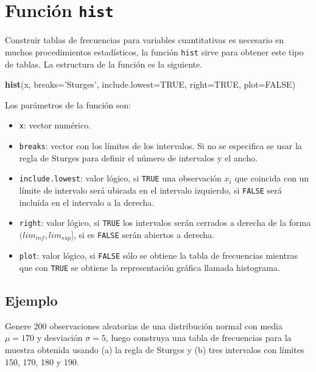 \documentclass[10pt,]{krantz}
\makeatletter
\newenvironment{Shaded}{\begin{snugshade}}{\end{snugshade}}
\newcommand{\KeywordTok}[1]{\textcolor[rgb]{0.13,0.29,0.53}{\textbf{{#1}}}}
\newcommand{\DataTypeTok}[1]{\textcolor[rgb]{0.13,0.29,0.53}{{#1}}}
\newcommand{\StringTok}[1]{\textcolor[rgb]{0.31,0.60,0.02}{{#1}}}
\newcommand{\OtherTok}[1]{\textcolor[rgb]{0.56,0.35,0.01}{{#1}}}
\newcommand{\NormalTok}[1]{{#1}}
\providecommand{\tightlist}{%
  \setlength{\itemsep}{0pt}\setlength{\parskip}{0pt}}
\newenvironment{kframe}{%
\medskip{}
\setlength{\fboxsep}{.8em}
 \def\at@end@of@kframe{}%
 \ifinner\ifhmode%
  \def\at@end@of@kframe{\end{minipage}}%
  \begin{minipage}{\columnwidth}%
 \fi\fi%
 \def\FrameCommand##1{\hskip\@totalleftmargin \hskip-\fboxsep
 \colorbox{shadecolor}{##1}\hskip-\fboxsep
     \hskip-\linewidth \hskip-\@totalleftmargin \hskip\columnwidth}%
 \MakeFramed {\advance\hsize-\width
   \@totalleftmargin\z@ \linewidth\hsize
   \@setminipage}}%
 {\par\unskip\endMakeFramed%
 \at@end@of@kframe}
\renewenvironment{Shaded}{\begin{kframe}}{\end{kframe}}
\makeatother
\begin{document}
\section{\texorpdfstring{Función \texttt{hist}
}{Función hist }}\label{funcion-hist}

Construir tablas de frecuencias para variables cuantitativas es
necesario en muchos procedimientos estadísticos, la función
\texttt{hist} sirve para obtener este tipo de tablas. La estructura de
la función es la siguiente.

\begin{Shaded}
\begin{Highlighting}[]
\KeywordTok{hist}\NormalTok{(x, }\DataTypeTok{breaks=}\StringTok{'Sturges'}\NormalTok{, }\DataTypeTok{include.lowest=}\OtherTok{TRUE}\NormalTok{, }\DataTypeTok{right=}\OtherTok{TRUE}\NormalTok{, }
     \DataTypeTok{plot=}\OtherTok{FALSE}\NormalTok{)}
\end{Highlighting}
\end{Shaded}

Los parámetros de la función son:

\begin{itemize}
\tightlist
\item
  \texttt{x}: vector numérico.
\item
  \texttt{breaks}: vector con los límites de los intervalos. Si no se
  especifica se usar la regla de Sturges para definir el número de
  intervalos y el ancho.
\item
  \texttt{include.lowest}: valor lógico, si \texttt{TRUE} una
  observación \(x_i\) que coincida con un límite de intervalo será
  ubicada en el intervalo izquierdo, si \texttt{FALSE} será incluída en
  el intervalo a la derecha.
\item
  \texttt{right}: valor lógico, si \texttt{TRUE} los intervalos serán
  cerrados a derecha de la forma \((lim_{inf}, lim_{sup}]\), si es
  \texttt{FALSE} serán abiertos a derecha.
\item
  \texttt{plot}: valor lógico, si \texttt{FALSE} sólo se obtiene la
  tabla de frecuencias mientras que con \texttt{TRUE} se obtiene la
  representación gráfica llamada histograma.
\end{itemize}

\subsection*{Ejemplo}\label{ejemplo-28}


Genere 200 observaciones aleatorias de una distribución normal con media
\(\mu=170\) y desviación \(\sigma=5\), luego construya una tabla de
frecuencias para la muestra obtenida usando (a) la regla de Sturges y
(b) tres intervalos con límites 150, 170, 180 y 190.
\end{document}
